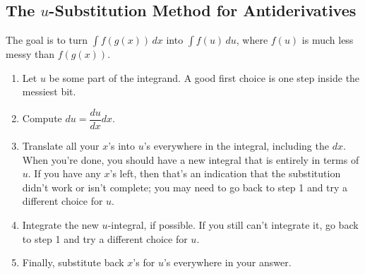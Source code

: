 \subsection{The $u$-Substitution Method for Antiderivatives}
The goal is to turn $\displaystyle\int f(g(x))\,dx$ into $\displaystyle\int f(u)\,du$, where $f(u)$ is much less messy than $f(g(x))$.
\begin{enumerate}
  \item Let $u$ be some part of the integrand. A good first choice is one step inside the messiest bit.
  \item Compute $du=\dfrac{du}{dx}dx$.
  \item Translate all your $x$'s into $u$'s everywhere in the integral, including the $dx$. When you're done, you should have a new integral that is entirely in terms of $u$. If you have any $x$'s left, then that's an indication that the substitution didn't work or isn't complete; you may need to go back to step 1 and try a different choice for $u$.
  \item Integrate the new $u$-integral, if possible. If you still can't integrate it, go back to step 1 and try a different choice for $u$.
  \item Finally, substitute back $x$'s for $u$'s everywhere in your answer.
\end{enumerate}
